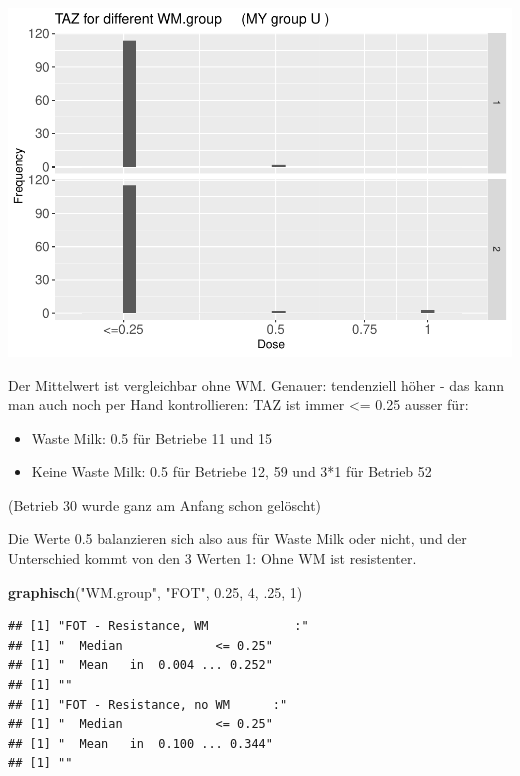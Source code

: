 \documentclass[
]{article}
\newenvironment{Shaded}{\begin{snugshade}}{\end{snugshade}}
\newcommand{\DecValTok}[1]{\textcolor[rgb]{0.00,0.00,0.81}{#1}}
\newcommand{\FloatTok}[1]{\textcolor[rgb]{0.00,0.00,0.81}{#1}}
\newcommand{\KeywordTok}[1]{\textcolor[rgb]{0.13,0.29,0.53}{\textbf{#1}}}
\newcommand{\NormalTok}[1]{#1}
\newcommand{\StringTok}[1]{\textcolor[rgb]{0.31,0.60,0.02}{#1}}
\providecommand{\tightlist}{%
  \setlength{\itemsep}{0pt}\setlength{\parskip}{0pt}}
\begin{document}
\includegraphics{Verteilungen_files/figure-latex/unnamed-chunk-37-1.pdf}

Der Mittelwert ist vergleichbar ohne WM. Genauer: tendenziell höher -
das kann man auch noch per Hand kontrollieren: TAZ ist immer \textless=
0.25 ausser für:

\begin{itemize}
\tightlist
\item
  Waste Milk: 0.5 für Betriebe 11 und 15
\item
  Keine Waste Milk: 0.5 für Betriebe 12, 59 und 3*1 für Betrieb 52
\end{itemize}

(Betrieb 30 wurde ganz am Anfang schon gelöscht)

Die Werte 0.5 balanzieren sich also aus für Waste Milk oder nicht, und
der Unterschied kommt von den 3 Werten 1: Ohne WM ist resistenter.

\begin{Shaded}
\begin{Highlighting}[]
  \KeywordTok{graphisch}\NormalTok{(}\StringTok{"WM.group"}\NormalTok{, }\StringTok{"FOT"}\NormalTok{, }\FloatTok{0.25}\NormalTok{,  }\DecValTok{4}\NormalTok{, }\FloatTok{.25}\NormalTok{, }\DecValTok{1}\NormalTok{)  }
\end{Highlighting}
\end{Shaded}

\begin{verbatim}
## [1] "FOT - Resistance, WM            :"
## [1] "  Median             <= 0.25"
## [1] "  Mean   in  0.004 ... 0.252"
## [1] ""
## [1] "FOT - Resistance, no WM      :"
## [1] "  Median             <= 0.25"
## [1] "  Mean   in  0.100 ... 0.344"
## [1] ""
\end{verbatim}
\end{document}

